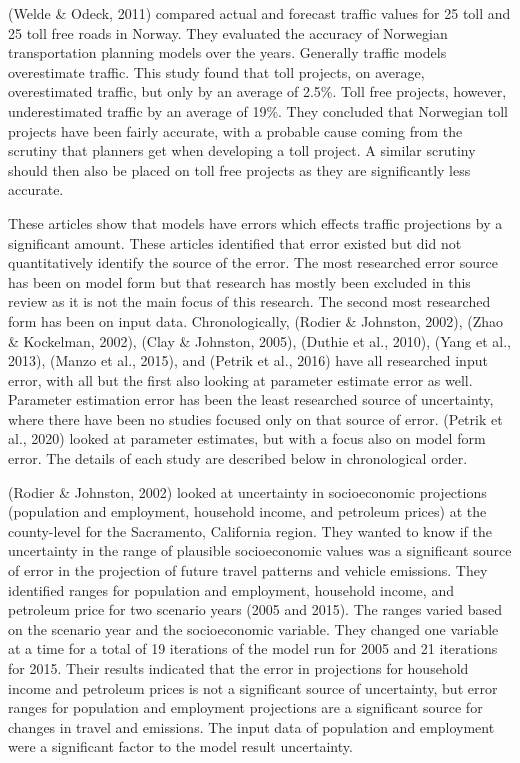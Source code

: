 \documentclass[
  letterpaper,
  number,
  review,
  3p]{elsarticle}
\begin{document}
(Welde \& Odeck, 2011) compared actual and forecast traffic values for
25 toll and 25 toll free roads in Norway. They evaluated the accuracy of
Norwegian transportation planning models over the years. Generally
traffic models overestimate traffic. This study found that toll
projects, on average, overestimated traffic, but only by an average of
2.5\%. Toll free projects, however, underestimated traffic by an average
of 19\%. They concluded that Norwegian toll projects have been fairly
accurate, with a probable cause coming from the scrutiny that planners
get when developing a toll project. A similar scrutiny should then also
be placed on toll free projects as they are significantly less accurate.

These articles show that models have errors which effects traffic
projections by a significant amount. These articles identified that
error existed but did not quantitatively identify the source of the
error. The most researched error source has been on model form but that
research has mostly been excluded in this review as it is not the main
focus of this research. The second most researched form has been on
input data. Chronologically, (Rodier \& Johnston, 2002), (Zhao \&
Kockelman, 2002), (Clay \& Johnston, 2005), (Duthie et al., 2010), (Yang
et al., 2013), (Manzo et al., 2015), and (Petrik et al., 2016) have all
researched input error, with all but the first also looking at parameter
estimate error as well. Parameter estimation error has been the least
researched source of uncertainty, where there have been no studies
focused only on that source of error. (Petrik et al., 2020) looked at
parameter estimates, but with a focus also on model form error. The
details of each study are described below in chronological order.

(Rodier \& Johnston, 2002) looked at uncertainty in socioeconomic
projections (population and employment, household income, and petroleum
prices) at the county-level for the Sacramento, California region. They
wanted to know if the uncertainty in the range of plausible
socioeconomic values was a significant source of error in the projection
of future travel patterns and vehicle emissions. They identified ranges
for population and employment, household income, and petroleum price for
two scenario years (2005 and 2015). The ranges varied based on the
scenario year and the socioeconomic variable. They changed one variable
at a time for a total of 19 iterations of the model run for 2005 and 21
iterations for 2015. Their results indicated that the error in
projections for household income and petroleum prices is not a
significant source of uncertainty, but error ranges for population and
employment projections are a significant source for changes in travel
and emissions. The input data of population and employment were a
significant factor to the model result uncertainty.
\end{document}

